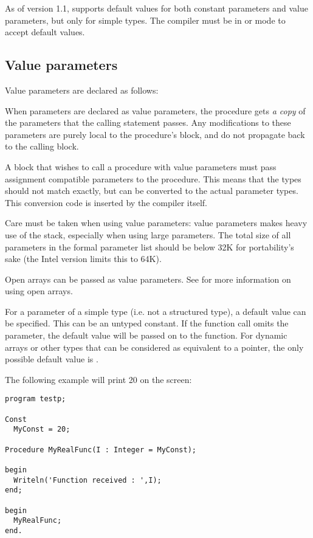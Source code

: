 As of version 1.1, \fpc supports default values for both constant parameters
and value parameters, but only for simple types. The compiler must be in
 or  mode to accept default values. 

\subsection{Value parameters}
Value parameters are declared as follows:

When parameters are declared as value parameters, the procedure gets {\em
a copy} of the parameters that the calling statement passes. Any modifications
to these parameters are purely local to the procedure's block, and do not
propagate back to the calling block.

A block that wishes to call a procedure with value parameters must pass
assignment compatible parameters to the procedure. This means that the types
should not match exactly, but can be converted to the actual parameter
types. This conversion code is inserted by the compiler itself.

Care must be taken when using value parameters: value parameters makes heavy
use of the stack, especially when using large parameters. The total size of
all parameters in the formal parameter list should be below 32K for
portability's sake (the Intel version limits this to 64K).

Open arrays can be passed as value parameters. See  for
more information on using open arrays.

For a parameter of a  simple type (i.e. not a structured type), a default
value can be specified. This can be an untyped constant. If the function
call omits the parameter, the default value will be passed on to the
function. For dynamic arrays or other types that can be considered as
equivalent to a pointer, the only possible default value is .

The following example will print 20 on the screen:
\begin{verbatim}
program testp;

Const
  MyConst = 20;

Procedure MyRealFunc(I : Integer = MyConst);

begin
  Writeln('Function received : ',I);
end;  
  
begin
  MyRealFunc;
end.    
\end{verbatim}

